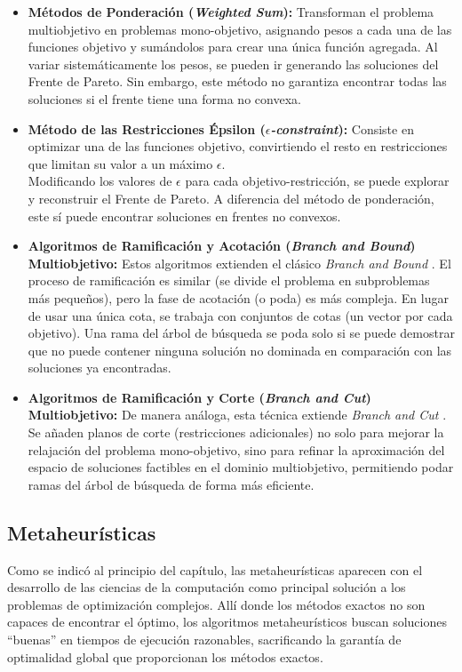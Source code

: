 \documentclass[12pt,a4paper]{book}
\begin{document}
\begin{itemize}
    \item \textbf{Métodos de Ponderación (\textit{Weighted Sum}):} Transforman el problema multiobjetivo en problemas mono-objetivo, asignando pesos a cada una de las funciones objetivo y sumándolos para crear una única función agregada. Al variar sistemáticamente los pesos, se pueden ir generando las soluciones del Frente de Pareto. Sin embargo, este método no garantiza encontrar todas las soluciones si el frente tiene una forma no convexa.

    \item \textbf{Método de las Restricciones Épsilon (\textit{$\epsilon$-constraint}):} Consiste en optimizar una de las funciones objetivo, convirtiendo el resto en restricciones que limitan su valor a un máximo $\epsilon$.\\
    Modificando los valores de $\epsilon$ para cada objetivo-restricción, se puede explorar y reconstruir el Frente de Pareto. A diferencia del método de ponderación, este sí puede encontrar soluciones en frentes no convexos.

    \item \textbf{Algoritmos de Ramificación y Acotación (\textit{Branch and Bound}) Multiobjetivo:} Estos algoritmos extienden el clásico \textit{Branch and Bound} \citep{bnb}. El proceso de ramificación es similar (se divide el problema en subproblemas más pequeños), pero la fase de acotación (o poda) es más compleja. En lugar de usar una única cota, se trabaja con conjuntos de cotas (un vector por cada objetivo). Una rama del árbol de búsqueda se poda solo si se puede demostrar que no puede contener ninguna solución no dominada en comparación con las soluciones ya encontradas.

    \item \textbf{Algoritmos de Ramificación y Corte (\textit{Branch and Cut}) Multiobjetivo:} De manera análoga, esta técnica extiende \textit{Branch and Cut} \citep{bnc}. Se añaden planos de corte (restricciones adicionales) no solo para mejorar la relajación del problema mono-objetivo, sino para refinar la aproximación del espacio de soluciones factibles en el dominio multiobjetivo, permitiendo podar ramas del árbol de búsqueda de forma más eficiente.
\end{itemize}

\subsection{Metaheurísticas}
Como se indicó al principio del capítulo, las metaheurísticas \citep{metaheuristicos} aparecen con el desarrollo de las ciencias de la computación como principal solución a los problemas de optimización complejos. Allí donde los métodos exactos no son capaces de encontrar el óptimo,
los algoritmos metaheurísticos buscan soluciones ``buenas'' en tiempos de ejecución razonables, sacrificando la garantía de optimalidad global que proporcionan los métodos exactos.
\end{document}
